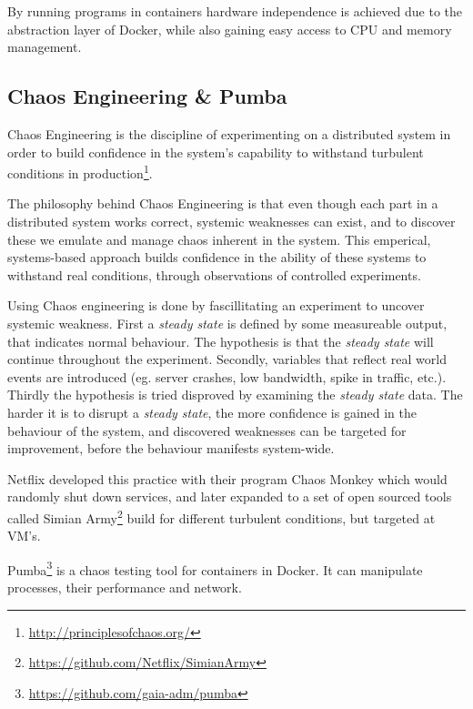 By running programs in containers hardware independence is achieved due to the abstraction layer of Docker, while also gaining easy access to CPU and memory management.


\subsection{Chaos Engineering \& Pumba}
Chaos Engineering is the discipline of experimenting on a distributed system in order to build confidence in the system’s capability to withstand turbulent conditions in production\footnote{\url{http://principlesofchaos.org/}}.

The philosophy behind Chaos Engineering is that even though each part in a distributed system works correct, systemic weaknesses can exist, and to discover these we emulate and manage chaos inherent in the system. This emperical, systems-based approach builds confidence in the ability of these systems to withstand real conditions, through observations of controlled experiments.

Using Chaos engineering is done by fascillitating an experiment to uncover systemic weakness.
First a \emph{steady state} is defined by some measureable output, that indicates normal behaviour. The hypothesis is that the \emph{steady state} will continue throughout the experiment.
Secondly, variables that reflect real world events are introduced (eg. server crashes, low bandwidth, spike in traffic, etc.).
Thirdly the hypothesis is tried disproved by examining the \emph{steady state} data.
The harder it is to disrupt a \emph{steady state}, the more confidence is gained in the behaviour of the system, and discovered weaknesses can be targeted for improvement, before the behaviour manifests system-wide.

Netflix developed this practice with their program Chaos Monkey which would randomly shut down services, and later expanded to a set of open sourced tools called Simian Army\footnote{\url{https://github.com/Netflix/SimianArmy}} build for different turbulent conditions, but targeted at \acs{VM}'s.

Pumba\footnote{\url{https://github.com/gaia-adm/pumba}} is a chaos testing tool for containers in Docker. It can manipulate processes, their performance and network.


